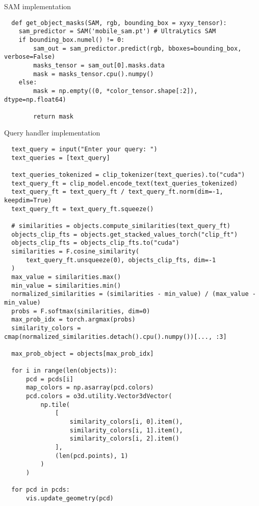 \documentclass[
  a4paper,  %
  twoside,  %
  bibliography=totoc,
  headsepline,
  cleardoublepage=empty,
  parskip=half,
  draft=false
]{scrbook}
\begin{document}
\begin{listing}[ht]
  \caption{ SAM implementation}
  \label{lst:samImpl}
\begin{lstlisting}
  def get_object_masks(SAM, rgb, bounding_box = xyxy_tensor):
    sam_predictor = SAM('mobile_sam.pt') # UltraLytics SAM
    if bounding_box.numel() != 0:
        sam_out = sam_predictor.predict(rgb, bboxes=bounding_box, verbose=False)
        masks_tensor = sam_out[0].masks.data
        mask = masks_tensor.cpu().numpy()
    else:
        mask = np.empty((0, *color_tensor.shape[:2]), dtype=np.float64)
    
        return mask
\end{lstlisting}
\end{listing}
\begin{listing}[ht]
  \caption{ Query handler implementation}
  \label{lst:queryHandler}
\begin{lstlisting}
  text_query = input("Enter your query: ")
  text_queries = [text_query]
  
  text_queries_tokenized = clip_tokenizer(text_queries).to("cuda")
  text_query_ft = clip_model.encode_text(text_queries_tokenized)
  text_query_ft = text_query_ft / text_query_ft.norm(dim=-1, keepdim=True)
  text_query_ft = text_query_ft.squeeze()
  
  # similarities = objects.compute_similarities(text_query_ft)
  objects_clip_fts = objects.get_stacked_values_torch("clip_ft")
  objects_clip_fts = objects_clip_fts.to("cuda")
  similarities = F.cosine_similarity(
      text_query_ft.unsqueeze(0), objects_clip_fts, dim=-1
  )
  max_value = similarities.max()
  min_value = similarities.min()
  normalized_similarities = (similarities - min_value) / (max_value - min_value)
  probs = F.softmax(similarities, dim=0)
  max_prob_idx = torch.argmax(probs)
  similarity_colors = cmap(normalized_similarities.detach().cpu().numpy())[..., :3]

  max_prob_object = objects[max_prob_idx]
  
  for i in range(len(objects)):
      pcd = pcds[i]
      map_colors = np.asarray(pcd.colors)
      pcd.colors = o3d.utility.Vector3dVector(
          np.tile(
              [
                  similarity_colors[i, 0].item(),
                  similarity_colors[i, 1].item(),
                  similarity_colors[i, 2].item()
              ], 
              (len(pcd.points), 1)
          )
      )

  for pcd in pcds:
      vis.update_geometry(pcd)  
\end{lstlisting}
\end{listing}
\pagestyle{empty}
\renewcommand*{\chapterpagestyle}{empty}
\Versicherung
\end{document}
